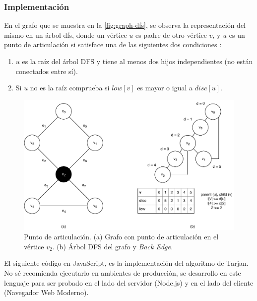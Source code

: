\subsubsection{Implementación}
En el grafo que se muestra en la \autoref{fig:graph-dfs}, se observa la representación del mismo en un árbol \acrshort{dfs}, donde un vértice \( u \) es padre de otro vértice \( v \), y \( u \) es un punto de articulación si satisface una de las siguientes dos condiciones \cite{Abdul.2018}:
\begin{enumerate}
	\item \( u \) es la raíz del árbol DFS y tiene al menos dos hijos independientes (no están conectados entre sí).
	\item Si \( u \) no es la raíz comprueba si \( low[v] \) es mayor o igual a \( disc[u] \).
\end{enumerate}
\begin{figure}[H]
	\centering
	\includegraphics[width=0.8\linewidth]{document/ArticulationPoints/images/graph-dfs}
	\caption{Punto de articulación. (a) Grafo con punto de articulación en el vértice \( v_2 \). (b) Árbol DFS del grafo y \textit{Back Edge.}}
	\label{fig:graph-dfs}
\end{figure}

El siguiente código en JavaScript, es la implementación del algoritmo de Tarjan. No sé recomienda ejecutarlo en ambientes de producción, se desarrollo en este lenguaje para ser probado en el lado del servidor (Node.js) y en el lado del cliente (Navegador Web Moderno).

